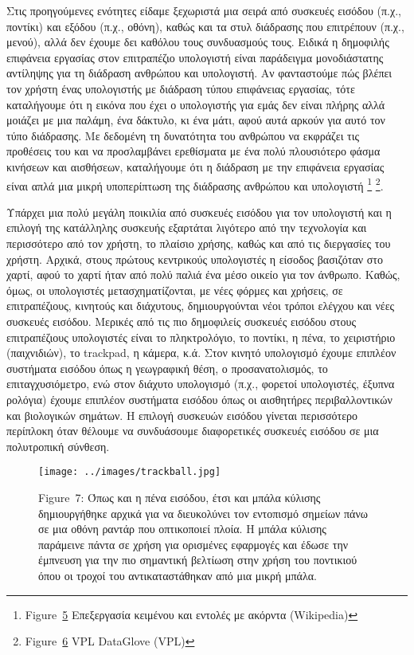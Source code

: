 \documentclass[
]{article}
\begin{document}
Στις προηγούμενες ενότητες είδαμε ξεχωριστά μια σειρά από συσκευές
εισόδου (π.χ., ποντίκι) και εξόδου (π.χ., οθόνη), καθώς και τα στυλ
διάδρασης που επιτρέπουν (π.χ., μενού), αλλά δεν έχουμε δει καθόλου τους
συνδυασμούς τους. Ειδικά η δημοφιλής επιφάνεια εργασίας στον επιτραπέζιο
υπολογιστή είναι παράδειγμα μονοδιάστατης αντίληψης για τη διάδραση
ανθρώπου και υπολογιστή. Αν φανταστούμε πώς βλέπει τον χρήστη ένας
υπολογιστής με διάδραση τύπου επιφάνειας εργασίας, τότε καταλήγουμε ότι
η εικόνα που έχει ο υπολογιστής για εμάς δεν είναι πλήρης αλλά μοιάζει
με μια παλάμη, ένα δάκτυλο, κι ένα μάτι, αφού αυτά αρκούν για αυτό τον
τύπο διάδρασης. Με δεδομένη τη δυνατότητα του ανθρώπου να εκφράζει τις
προθέσεις του και να προσλαμβάνει ερεθίσματα με ένα πολύ πλουσιότερο
φάσμα κινήσεων και αισθήσεων, καταλήγουμε ότι η διάδραση με την
επιφάνεια εργασίας είναι απλά μια μικρή υποπερίπτωση της διάδρασης
ανθρώπου και υπολογιστή \footnote{Figure~\protect\hyperlink{fig:chorded-input}{5}
  Επεξεργασία κειμένου και εντολές με ακόρντα (Wikipedia)} \footnote{Figure~\protect\hyperlink{fig:vpl-data-glove}{6}
  VPL DataGlove (VPL)}.

Υπάρχει μια πολύ μεγάλη ποικιλία από συσκευές εισόδου για τον υπολογιστή
και η επιλογή της κατάλληλης συσκευής εξαρτάται λιγότερο από την
τεχνολογία και περισσότερο από τον χρήστη, το πλαίσιο χρήσης, καθώς και
από τις διεργασίες του χρήστη. Αρχικά, στους πρώτους κεντρικούς
υπολογιστές η είσοδος βασιζόταν στο χαρτί, αφού το χαρτί ήταν από πολύ
παλιά ένα μέσο οικείο για τον άνθρωπο. Καθώς, όμως, οι υπολογιστές
μετασχηματίζονται, με νέες φόρμες και χρήσεις, σε επιτραπέζιους,
κινητούς και διάχυτους, δημιουργούνται νέοι τρόποι ελέγχου και νέες
συσκευές εισόδου. Μερικές από τις πιο δημοφιλείς συσκευές εισόδου στους
επιτραπέζιους υπολογιστές είναι το πληκτρολόγιο, το ποντίκι, η πένα, το
χειριστήριο (παιχνιδιών), το trackpad, η κάμερα, κ.ά. Στον κινητό
υπολογισμό έχουμε επιπλέον συστήματα εισόδου όπως η γεωγραφική θέση, ο
προσανατολισμός, το επιταγχυσιόμετρο, ενώ στον διάχυτο υπολογισμό (π.χ.,
φορετοί υπολογιστές, έξυπνα ρολόγια) έχουμε επιπλέον συστήματα εισόδου
όπως οι αισθητήρες περιβαλλοντικών και βιολογικών σημάτων. Η επιλογή
συσκευών εισόδου γίνεται περισσότερο περίπλοκη όταν θέλουμε να
συνδυάσουμε διαφορετικές συσκευές εισόδου σε μια πολυτροπική σύνθεση.

\leavevmode{}%
\begin{figure}
\hypertarget{fig:trackball}{%
\centering
\texttt{[image: ../images/trackball.jpg]}
\caption{Figure~7: Όπως και η πένα εισόδου, έτσι και μπάλα κύλισης
δημιουργήθηκε αρχικά για να διευκολύνει τον εντοπισμό σημείων πάνω σε
μια οθόνη ραντάρ που οπτικοποιεί πλοία. Η μπάλα κύλισης παράμεινε πάντα
σε χρήση για ορισμένες εφαρμογές και έδωσε την έμπνευση για την πιο
σημαντική βελτίωση στην χρήση του ποντικιού όπου οι τροχοί του
αντικαταστάθηκαν από μια μικρή μπάλα.}\label{fig:trackball}
}
\end{figure}
\end{document}

